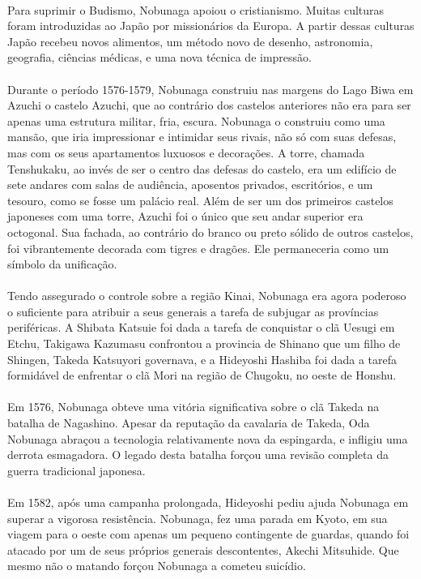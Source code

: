 \documentclass[12pt, a4paper]{article}
\begin{document}
            \\
            \indent Para suprimir o Budismo, Nobunaga apoiou o cristianismo. Muitas culturas foram introduzidas ao Japão por missionários da Europa. A partir dessas culturas Japão recebeu novos alimentos, um método novo de desenho, astronomia, geografia, ciências médicas, e uma nova técnica de impressão.\\
            \\
            \indent Durante o período 1576-1579, Nobunaga construiu nas margens do Lago Biwa em Azuchi o castelo Azuchi, que ao contrário dos castelos anteriores não era para ser apenas uma estrutura militar, fria, escura. Nobunaga o construiu como uma mansão, que iria impressionar e intimidar seus rivais, não só com suas defesas, mas com os seus apartamentos luxuosos e decorações. A torre, chamada Tenshukaku, ao invés de ser o centro das defesas do castelo, era um edifício de sete andares com salas de audiência, aposentos privados, escritórios, e um tesouro, como se fosse um palácio real. Além de ser um dos primeiros castelos japoneses com uma torre, Azuchi foi o único que seu andar superior era octogonal. Sua fachada, ao contrário do branco ou preto sólido de outros castelos, foi vibrantemente decorada com tigres e dragões. Ele permaneceria como um símbolo da unificação.\\
            \\
            \indent Tendo assegurado o controle sobre a região Kinai, Nobunaga era agora poderoso o suficiente para atribuir a seus generais a tarefa de subjugar as províncias periféricas. A Shibata Katsuie foi dada a tarefa de conquistar o clã Uesugi em Etchu, Takigawa Kazumasu confrontou a provincia de  Shinano que um filho de Shingen, Takeda Katsuyori governava, e a Hideyoshi Hashiba foi dada a tarefa formidável de enfrentar o clã Mori na região de Chugoku, no oeste de Honshu.\\
            \\
            \indent Em 1576, Nobunaga obteve uma vitória significativa sobre o clã Takeda na batalha de Nagashino. Apesar da reputação da cavalaria de Takeda, Oda Nobunaga abraçou a tecnologia relativamente nova da espingarda, e infligiu uma derrota esmagadora. O legado desta batalha forçou uma revisão completa da guerra tradicional japonesa.\\
            \\
            \indent Em 1582, após uma campanha prolongada, Hideyoshi pediu ajuda Nobunaga em superar a vigorosa resistência. Nobunaga, fez uma parada em Kyoto, em sua viagem para o oeste com apenas um pequeno contingente de guardas, quando foi atacado por um de seus próprios generais descontentes, Akechi Mitsuhide. Que mesmo não o matando forçou Nobunaga a cometeu suicídio.\\
            
\end{document}
